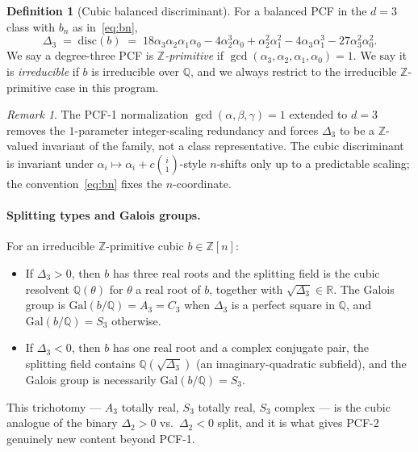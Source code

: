 \documentclass[11pt,a4paper]{article}
\theoremstyle{definition}
\newtheorem{definition}[conjecture]{Definition}
\theoremstyle{remark}
\newtheorem{remark}[conjecture]{Remark}
\newcommand{\Q}{\mathbb{Q}}
\newcommand{\Z}{\mathbb{Z}}
\newcommand{\R}{\mathbb{R}}
\newcommand{\disc}{\mathrm{disc}}
\newcommand{\Gal}{\mathrm{Gal}}
\begin{document}
\begin{definition}[Cubic balanced discriminant]\label{def:Delta3}
For a balanced PCF in the $d=3$ class with $b_{n}$ as in~\eqref{eq:bn},
\[
\Delta_{3}\;=\;\disc(b)\;=\;
18\alpha_{3}\alpha_{2}\alpha_{1}\alpha_{0}
-4\alpha_{2}^{3}\alpha_{0}
+\alpha_{2}^{2}\alpha_{1}^{2}
-4\alpha_{3}\alpha_{1}^{3}
-27\alpha_{3}^{2}\alpha_{0}^{2}.
\]
We say a degree-three PCF is \emph{$\Z$-primitive} if
$\gcd(\alpha_{3},\alpha_{2},\alpha_{1},\alpha_{0})=1$. We say it is
\emph{irreducible} if $b$ is irreducible over $\Q$, and we always
restrict to the irreducible $\Z$-primitive case in this program.
\end{definition}

\begin{remark}\label{rem:primitive}
The PCF-1 normalization $\gcd(\alpha,\beta,\gamma)=1$ extended to $d=3$
removes the $1$-parameter integer-scaling redundancy and forces
$\Delta_{3}$ to be a $\Z$-valued invariant of the family, not a class
representative. The cubic discriminant is invariant under
$\alpha_{i}\mapsto\alpha_{i}+c\binom{i}{1}$-style $n$-shifts only up to a
predictable scaling; the convention~\eqref{eq:bn} fixes the
$n$-coordinate.
\end{remark}

\paragraph{Splitting types and Galois groups.}
For an irreducible $\Z$-primitive cubic $b\in\Z[n]$:
\begin{itemize}
\item If $\Delta_{3}>0$, then $b$ has three real roots and the splitting
field is the cubic resolvent $\Q(\theta)$ for $\theta$ a real root of $b$,
together with $\sqrt{\Delta_{3}}\in\R$. The Galois group is
$\Gal(b/\Q)=A_{3}=C_{3}$ when $\Delta_{3}$ is a perfect square in $\Q$,
and $\Gal(b/\Q)=S_{3}$ otherwise.
\item If $\Delta_{3}<0$, then $b$ has one real root and a complex
conjugate pair, the splitting field contains $\Q(\sqrt{\Delta_{3}})$
(an imaginary-quadratic subfield), and the Galois group is necessarily
$\Gal(b/\Q)=S_{3}$.
\end{itemize}
This trichotomy --- $A_{3}$ totally real, $S_{3}$ totally real,
$S_{3}$ complex --- is the cubic analogue of the binary
$\Delta_{2}>0$ vs.\ $\Delta_{2}<0$ split, and it is what gives PCF-2
genuinely new content beyond PCF-1.
\end{document}
